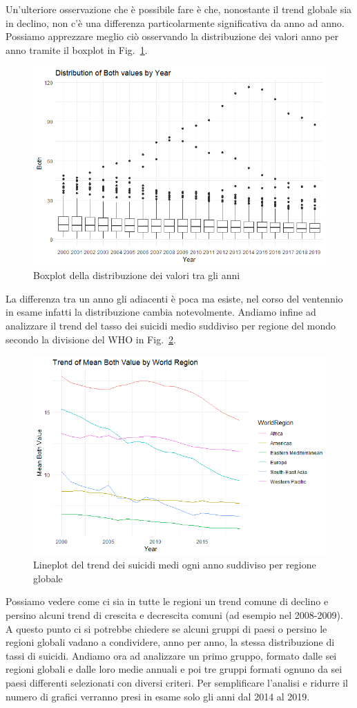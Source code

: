 \documentclass[conference]{IEEEtran}
\begin{document}
Un'ulteriore osservazione che è possibile fare è
che, nonostante il trend globale sia in declino, non c'è una differenza
particolarmente significativa da anno ad anno. Possiamo apprezzare meglio
ciò osservando la distribuzione dei valori anno per anno tramite il boxplot
in Fig.~\ref{3boxyears}.
\begin{figure}[htbp]
    \centerline{\includegraphics[width=.5\textwidth]{img/3 - Boxyears.png}}
    \caption{Boxplot della distribuzione dei valori tra gli anni}
    \label{3boxyears}
\end{figure}
La differenza tra un anno gli adiacenti è poca ma esiste, nel corso del ventennio
in esame infatti la distribuzione cambia notevolmente.
Andiamo infine ad analizzare il trend del tasso dei suicidi medio suddiviso
per regione del mondo secondo la divisione del WHO in Fig.~\ref{4wrtrend}.
\begin{figure}[htbp]
    \centerline{\includegraphics[width=.5\textwidth]{img/4 - WRTrend.png}}
    \caption{Lineplot del trend dei suicidi medi ogni anno suddiviso per regione globale}
    \label{4wrtrend}
\end{figure}
Possiamo vedere come ci sia in tutte le regioni un trend comune di declino e persino
alcuni trend di crescita e decrescita comuni (ad esempio nel 2008-2009).
A questo punto ci si potrebbe chiedere se alcuni gruppi
di paesi o persino le regioni globali vadano a condividere, anno per anno,
la stessa distribuzione di tassi di suicidi. Andiamo ora ad analizzare
un primo gruppo, formato dalle sei regioni globali e dalle loro medie annuali
e poi tre gruppi formati ognuno da sei paesi differenti selezionati con diversi criteri.
Per semplificare l'analisi e ridurre il numero di grafici verranno presi in esame solo
gli anni dal 2014 al 2019.
\end{document}
